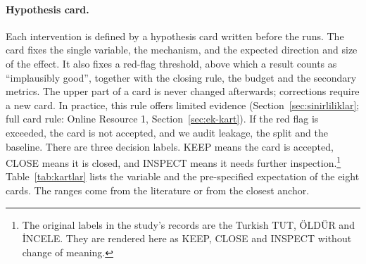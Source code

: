 \documentclass[pdflatex,iicol,sn-mathphys-num]{sn-jnl}
\begin{document}
\paragraph{Hypothesis card.}
Each intervention is defined by a hypothesis card written before the runs. The card fixes the single variable, the mechanism, and the expected direction and size of the effect. It also fixes a red-flag threshold, above which a result counts as ``implausibly good'', together with the closing rule, the budget and the secondary metrics. The upper part of a card is never changed afterwards; corrections require a new card. In practice, this rule offers limited evidence (Section~\ref{sec:sinirliliklar}; full card rule: Online Resource 1, Section~\ref{sec:ek-kart}). If the red flag is exceeded, the card is not accepted, and we audit leakage, the split and the baseline. There are three decision labels. KEEP means the card is accepted, CLOSE means it is closed, and INSPECT means it needs further inspection.\footnote{The original labels in the study's records are the Turkish TUT, ÖLDÜR and İNCELE. They are rendered here as KEEP, CLOSE and INSPECT without change of meaning.} Table~\ref{tab:kartlar} lists the variable and the pre-specified expectation of the eight cards. The ranges come from the literature or from the closest anchor.
\end{document}
